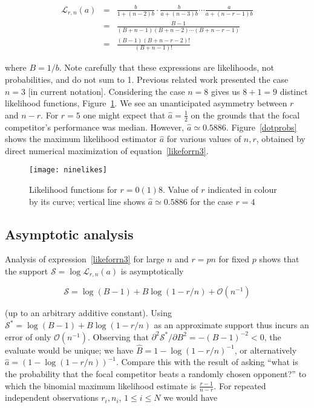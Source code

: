\documentclass[article]{ajs}
\begin{document}
\begin{eqnarray}\label{likeforrn1}
  \mathcal{L}_{r,n}(a) &=&
\frac{b}{1+ (n-2)b}\cdot
\frac{b}{a+(n-3)b}\cdots\frac{a}{a+(n-r-1)b}\nonumber\\
&=& \frac{B-1}{(B+n-1)(B+n-2)\cdots(B+n-r-1)}\nonumber\\ 
&=& \frac{(B-1)(B+n-r-2)!}{(B+n-1)!}\label{likeforrn3}
\end{eqnarray}

\noindent where $B=1/b$.  Note carefully that these expressions are
likelihoods, not probabilities, and do not sum to 1.  Previous related
work \citep{hankin2024_hyper3} presented the case $n=3$ [in current
  notation].  Considering the case $n=8$ gives us $8+1=9$ distinct
likelihood functions, Figure~\ref{ninelikes}.  We see an unanticipated
asymmetry between $r$ and $n-r$.  For $r=5$ one might expect that
$\hat{a}=\frac{1}{2}$ on the grounds that the focal competitor's
performance was median.  However, $\hat{a}\simeq 0.5886$.
Figure~\ref{dotprobs} shows the maximum likelihood estimator $\hat{a}$
for various values of $n,r$, obtained by direct numerical maximization
of equation~\ref{likeforrn3}.

\begin{figure}[t]
  \begin{centering}
\texttt{[image: ninelikes]}  %
\caption{Likelihood functions for $r=0(1)8$\label{ninelikes}.  Value
  of $r$ indicated in colour by its curve; vertical line shows
  $\hat{a}\simeq 0.5886$ for the case $r=4$}
\end{centering}
\end{figure}


\subsection{Asymptotic analysis}

Analysis of expression~\ref{likeforrn3} for large $n$ and $r=pn$ for
fixed $p$ shows that the support
$\mathcal{S}=\log\mathcal{L}_{r,n}(a)$ is asymptotically

\begin{equation}\label{asymptotic}
\mathcal{S}=
\log(B-1) + B\log(1-r/n)
+\mathcal{O}\left(n^{-1}\right)
\end{equation}

(up to an arbitrary additive constant).  Using
$\mathcal{S}^*=\log(B-1)+B\log(1-r/n)$ as an approximate support thus
incurs an error of only $\mathcal{O}(n^{-1})$.  Observing that
$\partial^2\mathcal{S}^*/\partial B^2=-(B-1)^{-2}<0$, the evaluate
would be unique; we have $\hat{B}=1-\log(1-r/n)^{-1}$, or
alternatively $\hat{a}=(1-\log(1-r/n))^{-1}$.  Compare this with the
result of asking ``what is the probability that the focal competitor
beats a randomly chosen opponent?'' to which the binomial maximum
likelihood estimate is $\frac{r-1}{n-r}$.  For repeated independent
observations $r_i,n_i$, $1\leqslant i\leqslant N$ we would have
\end{document}

